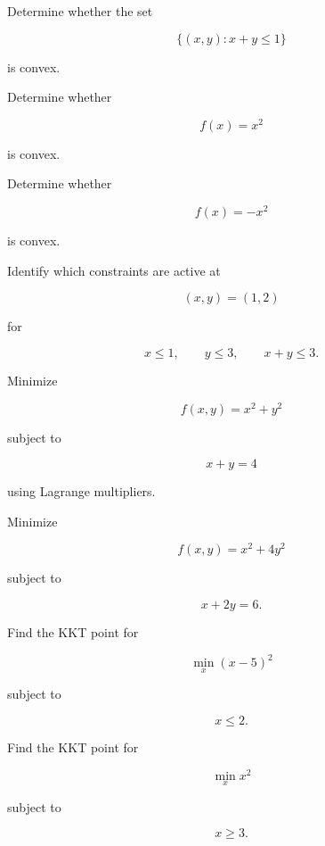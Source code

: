 \begin{exercise}[2]
Determine whether the set

\[
\{
(x,y):
x+y\leq1
\}
\]

is convex.
\end{exercise}

\begin{exercise}[2]
Determine whether

\[
f(x)=x^2
\]

is convex.
\end{exercise}

\begin{exercise}[2]
Determine whether

\[
f(x)=-x^2
\]

is convex.
\end{exercise}

\begin{exercise}[2]
Identify which constraints are active at

\[
(x,y)=(1,2)
\]

for

\[
x\leq1,
\qquad
y\leq3,
\qquad
x+y\leq3.
\]
\end{exercise}

\begin{exercise}[3]
Minimize

\[
f(x,y)=x^2+y^2
\]

subject to

\[
x+y=4
\]

using Lagrange multipliers.
\end{exercise}

\begin{exercise}[3]
Minimize

\[
f(x,y)=x^2+4y^2
\]

subject to

\[
x+2y=6.
\]
\end{exercise}

\begin{exercise}[3]
Find the KKT point for

\[
\min_x
(x-5)^2
\]

subject to

\[
x\leq2.
\]
\end{exercise}

\begin{exercise}[3]
Find the KKT point for

\[
\min_x
x^2
\]

subject to

\[
x\geq3.
\]
\end{exercise}

